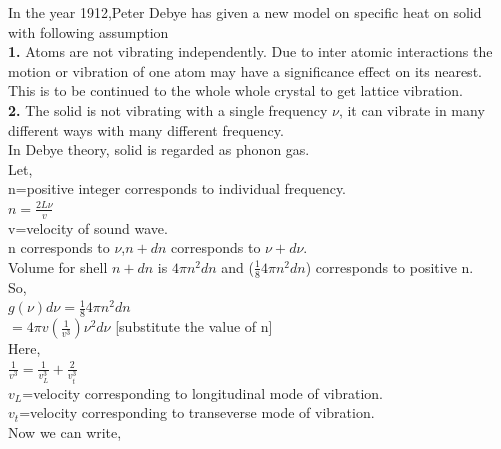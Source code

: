 \documentclass{article}
\newcommand*{\1}{\hspace{1pt}}
\begin{document}
In the year 1912,Peter Debye\cite{l10} has given a new model on specific heat on solid with following assumption\\

\textbf{1.}  Atoms are not vibrating independently. Due to inter atomic interactions the motion or vibration of one atom may have a significance effect on its nearest. This is to be continued to the whole whole crystal to get lattice vibration.\\

\textbf{2.} The solid is not vibrating with a single frequency $\nu$, it can vibrate in many different ways with many different frequency.\\

In Debye theory, solid is regarded as phonon gas.\\

Let,\\

n=positive integer corresponds to individual frequency.\\

$n=\frac{2L\nu}{v}$\\

v=velocity of sound wave.\\

n corresponds to $\nu$,$n+dn$ corresponds to $\nu+d\nu$.\\

Volume for shell $ n+dn$ is $4\pi n^2dn$ and ($\frac{1}{8} 4\pi n^2 dn$) corresponds to positive n.\\

So,\\

$g(\nu)d\nu=\frac{1}{8}4\pi n^2 dn$\\

$=4\pi v(\frac{1}{v^3})\nu^2d\nu$  [substitute the value of n]\\


Here,\\

$\frac{1}{v^3}=\frac{1}{v_L^3}+\frac{2}{v_t^3}$\\


$v_L$=velocity corresponding to longitudinal mode of vibration.\\

$v_t$=velocity corresponding to transeverse mode of vibration.\\

Now we can write,\\
\end{document}
